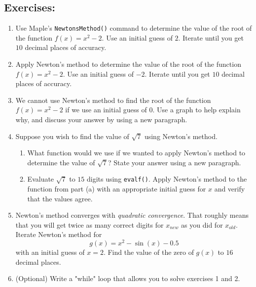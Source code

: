 \subsection*{Exercises:}

\begin{enumerate}
    \item  Use Maple's \texttt{NewtonsMethod()} command to determine the value of the root of the function $f(x) = x^2 - 2$.  Use an initial guess of $2$.  Iterate until you get $10$ decimal places of accuracy.
    
    \item   Apply Newton's method to determine the value of the root of the function $f(x) = x^2 - 2$.  Use an initial guess of $-2$.  Iterate until you get $10$ decimal places of accuracy.
    \item   We cannot use Newton's method to find the root of the function $f(x) = x^2 - 2$ if we use an initial guess of $0$.  Use a graph to help explain why, and discuss your answer by using a new paragraph.
    \item   Suppose you wish to find the value of $\sqrt{7}$ using Newton's method.
	    \begin{enumerate}
	    \item What function would we use if we wanted to apply Newton's method to determine the value of $\sqrt{7}$? State your answer using a new paragraph.
	    \item Evaluate $\sqrt{7}$ to $15$ digits using \texttt{evalf()}. Apply Newton's method to the function from part (a) with an appropriate initial guess for $x$ and verify that the values agree.
	    \end{enumerate}
    \item   Newton's method converges with \textit{quadratic convergence}.  That roughly means that you will get twice as many correct digits for $x_{new}$ as you did for $x_{old}$. Iterate Newton's method for \[g(x) = x^2 - \sin(x) - 0.5\] with an initial guess of $x = 2$.  Find the value of the zero of $g(x)$ to $16$ decimal places.
    
   \item (Optional) Write a "while" loop that allows you to solve exercises 1 and 2.
\end{enumerate}